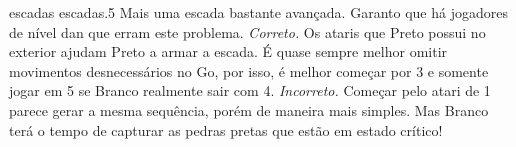 \problemAnswerDiagram
  {escadas}
  {escadas.5}
  {Mais uma escada bastante avançada. Garanto que há jogadores de nível dan que erram este problema.}
  {\emph{Correto.} Os ataris que Preto possui no exterior ajudam Preto a armar a escada. É quase sempre melhor omitir movimentos desnecessários no Go, por isso, é melhor começar por 3 e somente jogar em 5 se Branco realmente sair com 4.}
  {\emph{Incorreto.} Começar pelo atari de 1 parece gerar a mesma sequência, porém de maneira mais simples. Mas Branco terá o tempo de capturar as pedras pretas que estão em estado crítico!}